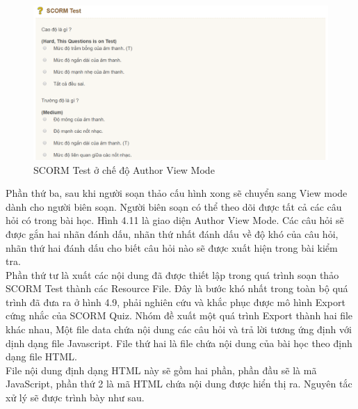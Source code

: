 	\begin{center}
	\begin{figure}[htp]
		\begin{center}
			\includegraphics[width=16cm]{Chapter4/Pictures/picture411.png}
		\end{center}
		\caption{SCORM Test ở chế độ Author View Mode}
		\label{refpicture58}
	\end{figure}
\end{center}

\newpage

	Phần thứ ba, sau khi người soạn thảo cấu hình xong sẽ chuyển sang View mode dành cho người biên soạn. Người biên soạn có thể theo dõi được tất cả các câu hỏi có trong bài học. Hình 4.11 là giao diện Author View Mode. Các câu hỏi sẽ được gắn hai nhãn đánh dấu, nhãn thứ nhất đánh dấu về độ khó của câu hỏi, nhãn thứ hai đánh dấu cho biết câu hỏi nào sẽ được xuất hiện trong bài kiểm tra.\\
	
	Phần thứ tư là xuất các nội dung đã được thiết lập trong quá trình soạn thảo SCORM Test thành các Resource File. Đây là bước khó nhất trong toàn bộ quá trình đã đưa ra ở hình 4.9, phải nghiên cứu và khắc phục được mô hình Export cứng nhắc của SCORM Quiz. Nhóm đề xuất một quá trình Export thành hai file khác nhau, Một file data chứa nội dung các câu hỏi và trả lời tương ứng định với dịnh dạng file Javascript. File thứ hai là file chứa nội dung của bài học theo định dạng file HTML. \\
	
	File nội dung định dạng HTML này sẽ gồm hai phần, phần đầu sẽ là mã JavaScript, phần thứ 2 là mã HTML chứa nội dung được hiển thị ra. Nguyên tắc xử lý sẽ được trình bày như sau.\\
	
